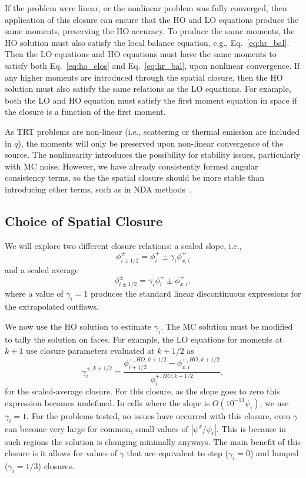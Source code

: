 If the problem were linear, or the nonlinear problem was fully converged,
then application of this closure can ensure that the HO and LO equations produce the same
moments, preserving the HO accuracy.  To produce the
same moments, the HO solution must also satisfy the local balance equation, e.g.,
Eq.~\eqref{eq:hr_bal}.  Then the LO equations and HO equations must have the same moments
to satisfy both Eq.~\eqref{eq:ho_clos} and Eq.~\eqref{eq:hr_bal}, upon nonlinear
convergence. If any higher moments are introduced through the spatial closure,
then the HO solution must also satisfy the same relations as the LO equations.  For example, both the LO and HO equation must satisfy the
first moment equation in space if the closure is a function of the first moment.  

As TRT problems are non-linear (i.e., scattering or thermal emission are included in
$q$), the moments will only be preserved upon non-linear convergence of the source.  The
nonlinearity introduces the possibility for stability
issues, particularly with MC noise.  However, we have already consistently formed angular consistency terms, so the
the spatial closure should be more stable than introducing other terms, such as
in NDA methods~\cite{rmc,holo,willert}. 





\subsection{Choice of Spatial Closure}
\label{sec:spat_clos_options}

We will
explore two different closure relations: a scaled slope, i.e.,
\begin{equation}\label{eq:cl_slope}
    \phi_{i\pm1/2}^\pm = \phi_i^+ \pm \gamma_i \phi_{x,i}^+
\end{equation}
and a scaled average
\begin{equation}\label{eq:cl_avg}
    \phi_{i\pm1/2}^\pm = \gamma_i \phi_i^+ \pm \phi_{x,i}^+,
\end{equation}
where a value of $\gamma_i = 1$ produces the standard linear discontinuous expressions for
the extrapolated outflows.  

We now use the HO solution to estimate $\gamma_i$. The MC solution must be modified
to tally the solution on faces. For example, the LO equations for
moments at $k+1$ use closure parameters evaluated at $k+1/2$ as
\begin{equation}
    \gamma_i^{+,k+1/2} = \frac{\phi_{i+1/2}^{+,HO,k+1/2} -
    \phi_{x,i}^{+,HO,k+1/2}}{\phi_i^{+,HO,k+1/2}},
\end{equation}
for the scaled-average closure.  For this closure, as the slope goes to zero this expression
becomes undefined.  In cells where the slope is $O(10^{-13} \psi_i)$, we use $\gamma_i=1$.
For the problems tested, no issues have occurred with this closure, even $\gamma$
can become very large for common, small values of $|\psi^x/\psi_i|$.  This is because in
such regions the solution is changing minimally anyways. 
The main benefit of this closure is it allows for values of $\gamma$ that are
equivalent to step ($\gamma_i=0$) and lumped ($\gamma_i=1/3$) closures.

